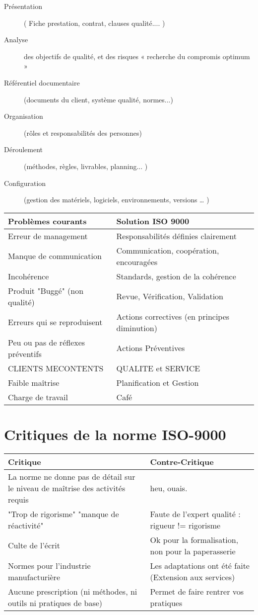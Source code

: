 \begin{description}
	\item[Présentation]( Fiche prestation, contrat, clauses qualité.... )
	\item[Analyse] des objectifs de qualité, et des risques « recherche du compromis optimum »
	\item[Référentiel documentaire] (documents du client, système qualité, normes...)
	\item[Organisation] (rôles et responsabilités des personnes)
	\item[Déroulement] (méthodes, règles, livrables, planning... )
	\item[Configuration] (gestion des matériels, logiciels, environnements, versions … )
\end{description}

\begin{tabular}{|p{7cm}|p{7cm}|}
	\hline
	Problèmes courants & Solution ISO 9000 \\
	\hline
	\hline
	Erreur de management & Responsabilités définies clairement \\
	\hline
	Manque de communication & Communication, coopération,
	encouragées\\
	\hline
	Incohérence & Standards, gestion de la cohérence \\
	\hline
	Produit "Buggé" (non qualité) & Revue, Vérification, Validation\\
	\hline
	Erreurs qui se reproduisent & Actions correctives (en principes diminution)\\
	\hline
	Peu ou pas de réflexes préventifs & Actions Préventives\\
	\hline
	CLIENTS MECONTENTS & QUALITE et SERVICE\\
	\hline
	Faible maîtrise & Planification et Gestion\\
	\hline
	Charge de travail & Café\\
    \hline
\end{tabular}


\section{Critiques de la norme ISO-9000}
\begin{tabular}{|p{7cm}|p{7cm}|}
	\hline
	Critique & Contre-Critique\\
	\hline
	\hline
	La norme ne donne pas de détail sur le niveau de maîtrise des activités requis & heu, ouais.\\
	\hline
	"Trop de rigorisme" "manque de réactivité" & Faute de l’expert qualité : rigueur != rigorisme \\
	\hline
	Culte de l’écrit & Ok pour la formalisation, non pour la paperasserie\\
	\hline
	Normes pour l'industrie manufacturière & Les adaptations ont été faite (Extension aux services)\\
	\hline
	Aucune prescription (ni méthodes, ni outils ni pratiques de base) & Permet de faire rentrer vos pratiques\\
\hline
\end{tabular}


